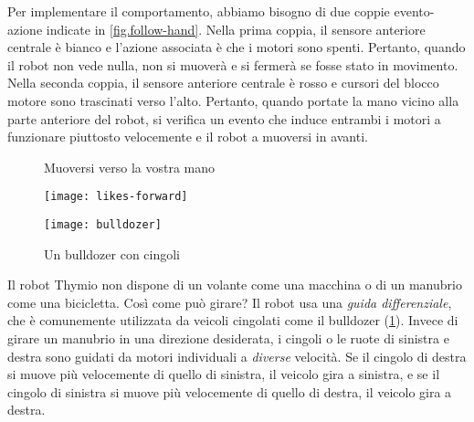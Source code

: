 \label {page.sensors}

Per implementare il comportamento, abbiamo bisogno di due coppie evento-azione indicate in
\cref{fig.follow-hand}. Nella prima coppia, il sensore anteriore centrale
è bianco e l'azione associata è che i motori sono spenti.
Pertanto, quando il robot non vede nulla, non si muoverà e
si fermerà se fosse stato in movimento. Nella seconda coppia, il sensore anteriore centrale è rosso e cursori del blocco motore sono trascinati verso l'alto.
Pertanto, quando portate la mano vicino alla parte anteriore del robot, si verifica un evento che induce entrambi i motori a funzionare piuttosto velocemente e il robot a muoversi in avanti.

\begin{figure}
\begin{floatrow}
	\ffigbox
	{\caption{Muoversi verso la vostra mano}\label{fig.follow-hand}}
	{\texttt{[image: likes-forward]}}
	\ffigbox
	{\caption{Un bulldozer con cingoli}\label{fig.bull}}
	{\texttt{[image: bulldozer]}}
\end{floatrow}
\end{figure}



Il robot Thymio non dispone di un volante come una macchina o di un
manubrio come una bicicletta. Così come può girare? Il robot usa una
\emph{guida differenziale}, che è comunemente utilizzata da veicoli cingolati come il
bulldozer (\cref{fig.bull}). Invece di girare un manubrio in una
direzione desiderata, i cingoli o le ruote di sinistra e destra sono guidati da
motori individuali a \emph{diverse} velocità. Se il cingolo di destra si muove
più velocemente di quello di sinistra, il veicolo gira a sinistra, e se il cingolo di sinistra
si muove più velocemente di quello di destra, il veicolo gira a destra.

